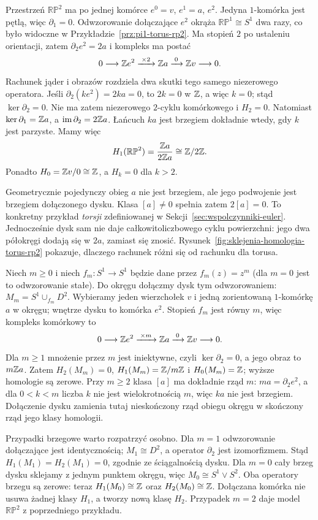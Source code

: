 \begin{przyklad}
\label{prz:homologia-rp2}
Przestrzeń $\mathbb{RP}^2$
ma po jednej komórce
$e^0=v$, $e^1=a$, $e^2$.
Jedyna $1$-komórka jest pętlą,
więc $\partial_1=0$.
Odwzorowanie dołączające $e^2$
okrąża $\mathbb{RP}^1\cong S^1$
dwa razy, co było widoczne
w Przykładzie~\ref{prz:pi1-torus-rp2}.
Ma stopień $2$ po ustaleniu
orientacji, zatem $\partial_2e^2=2a$ i kompleks ma postać
\[
 0\longrightarrow\mathbb{Z} e^2
 \xrightarrow{\;\times2\;}\mathbb{Z} a
 \xrightarrow{\;0\;}\mathbb{Z} v
 \longrightarrow0.
\]
Rachunek jąder i obrazów rozdziela dwa skutki tego samego
niezerowego operatora. Jeśli $\partial_2(ke^2)=2ka=0$,
to $2k=0$ w $\mathbb{Z}$, a więc $k=0$; stąd $\ker\partial_2=0$.
Nie ma zatem niezerowego $2$-cyklu komórkowego i $H_2=0$.
Natomiast $\ker\partial_1=\mathbb{Z} a$, a
$\operatorname{im}\partial_2=2\mathbb{Z} a$.
Łańcuch $ka$ jest brzegiem dokładnie wtedy, gdy $k$ jest parzyste.
Mamy więc
\[
 H_1(\mathbb{RP}^2)
 =\frac{\mathbb{Z} a}{2\mathbb{Z} a}\cong\mathbb{Z}/2\mathbb{Z}.
\]
Ponadto $H_0=\mathbb{Z} v/0\cong\mathbb{Z}$, a $H_k=0$ dla $k>2$.

Geometrycznie pojedynczy obieg $a$ nie jest brzegiem,
ale jego podwojenie jest brzegiem dołączonego dysku.
Klasa $[a]\ne0$ spełnia zatem $2[a]=0$.
To konkretny przykład \emph{torsji} zdefiniowanej w
Sekcji~\ref{sec:wspolczynniki-euler}.
Jednocześnie dysk sam nie daje całkowitoliczbowego cyklu powierzchni:
jego dwa półokręgi dodają się w $2a$, zamiast się znosić.
Rysunek~\ref{fig:sklejenia-homologia-torus-rp2} pokazuje,
dlaczego rachunek różni się od rachunku dla torusa.
\end{przyklad}

\begin{przyklad}
\label{prz:homologia-dolaczenie-stopien-m}
Niech $m\geq0$ i niech $f_m:S^1\to S^1$ będzie dane przez
$f_m(z)=z^m$ (dla $m=0$ jest to odwzorowanie stałe).
Do okręgu dołączmy dysk tym odwzorowaniem:
$M_m=S^1\cup_{f_m}D^2$.
Wybieramy jeden wierzchołek $v$ i jedną zorientowaną
$1$-komórkę $a$ w okręgu; wnętrze dysku to komórka $e^2$.
Stopień $f_m$ jest równy $m$, więc kompleks komórkowy to
\[
 0\longrightarrow\mathbb{Z} e^2
 \xrightarrow{\;\times m\;}\mathbb{Z} a
 \xrightarrow{\;0\;}\mathbb{Z} v\longrightarrow0.
\]
Dla $m\geq1$ mnożenie przez $m$ jest iniektywne,
czyli $\ker\partial_2=0$, a jego obraz to $m\mathbb{Z} a$.
Zatem $H_2(M_m)=0$, $H_1(M_m)=\mathbb{Z}/m\mathbb{Z}$ i $H_0(M_m)=\mathbb{Z}$;
wyższe homologie są zerowe.
Przy $m\geq2$ klasa $[a]$ ma dokładnie rząd $m$:
$ma=\partial_2e^2$, a dla $0<k<m$ liczba $k$ nie jest
wielokrotnością $m$, więc $ka$ nie jest brzegiem.
Dołączenie dysku zamienia tutaj nieskończony rząd obiegu okręgu
w skończony rząd jego klasy homologii.

Przypadki brzegowe warto rozpatrzyć osobno.
Dla $m=1$ odwzorowanie dołączające jest identycznością;
$M_1\cong D^2$, a operator $\partial_2$ jest izomorfizmem.
Stąd $H_1(M_1)=H_2(M_1)=0$, zgodnie ze ściągalnością dysku.
Dla $m=0$ cały brzeg dysku sklejamy z jednym punktem okręgu,
więc $M_0\cong S^1\vee S^2$.
Oba operatory brzegu są zerowe: teraz
$H_1(M_0)\cong\mathbb{Z}$ oraz $H_2(M_0)\cong\mathbb{Z}$.
Dołączana komórka nie usuwa żadnej klasy $H_1$, a tworzy nową klasę $H_2$.
Przypadek $m=2$ daje model $\mathbb{RP}^2$ z poprzedniego przykładu.
\end{przyklad}

